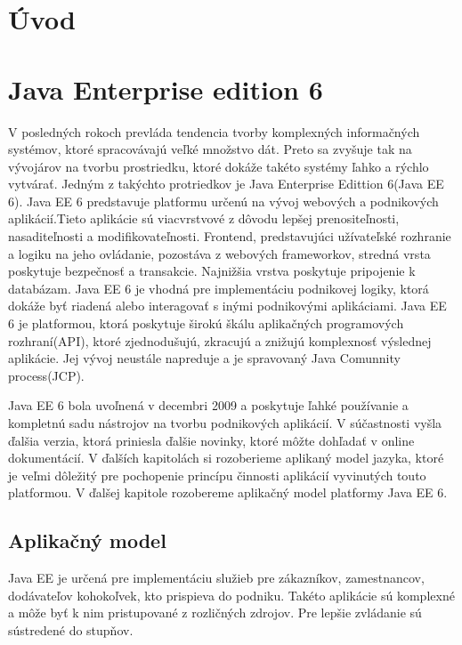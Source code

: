 

\chapter{Úvod}





\chapter{Java Enterprise edition 6}
V posledných rokoch prevláda tendencia tvorby komplexných informačných systémov, ktoré spracovávajú veľké množstvo dát. Preto sa zvyšuje tak na vývojárov na tvorbu prostriedku, ktoré dokáže takéto systémy ľahko a rýchlo vytvárať. Jedným z takýchto protriedkov je Java Enterprise Edittion 6(Java EE 6).
Java EE 6 predstavuje platformu určenú na vývoj webových a podnikových aplikácií.\cite{fitWeb}Tieto aplikácie sú viacvrstvové z dôvodu lepšej prenositeľnosti, nasaditeľnosti a modifikovateľnosti. Frontend, predstavujúci užívateľské rozhranie a logiku na jeho ovládanie, pozostáva z webových frameworkov, stredná vrsta poskytuje bezpečnosť a transakcie. Najnižšia vrstva poskytuje pripojenie k databázam. Java EE 6 je vhodná pre implementáciu podnikovej logiky, ktorá dokáže byť riadená alebo interagovať s inými podnikovými aplikáciami. Java EE 6 je platformou, ktorá poskytuje širokú škálu aplikačných programových rozhraní(API), ktoré zjednodušujú, zkracujú a znižujú komplexnosť výslednej aplikácie. Jej vývoj neustále napreduje a je spravovaný Java Comunnity process(JCP).


\indent Java EE 6 bola uvoľnená v decembri 2009 a poskytuje ľahké používanie a kompletnú sadu nástrojov na tvorbu podnikových aplikácií. V súčastnosti vyšla ďalšia verzia, ktorá priniesla ďalšie novinky, ktoré môžte dohľadať v online dokumentácií. V ďalších kapitolách si rozoberieme aplikaný model jazyka, ktoré je veľmi dôležitý pre pochopenie princípu činnosti aplikácií vyvinutých touto platformou. V ďalšej kapitole rozobereme aplikačný model platformy Java EE 6. 


\section{Aplikačný model}
Java EE je určená pre implementáciu služieb pre zákazníkov, zamestnancov, dodávateľov kohokoľvek, kto prispieva do podniku. Takéto aplikácie sú komplexné a môže byť k nim pristupované z rozličných zdrojov. Pre lepšie zvládanie sú sústredené do stupňov.

